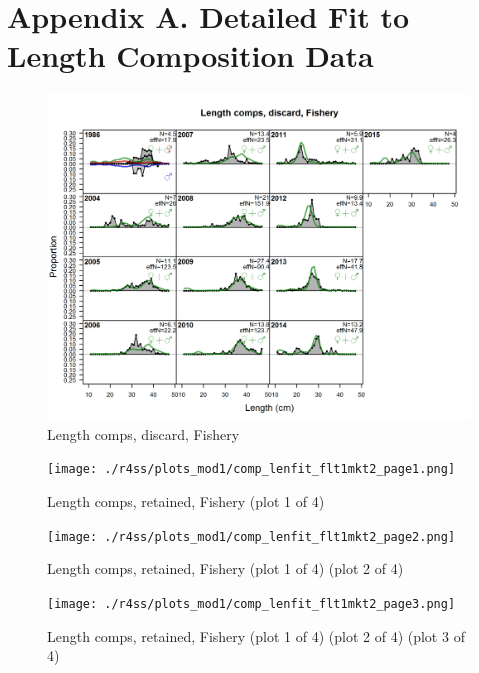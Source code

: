 \documentclass[12pt,]{article}
\begin{document}
\FloatBarrier

\newpage

\FloatBarrier
\newpage

\section{Appendix A. Detailed Fit to Length Composition
Data}\label{appendix-a.-detailed-fit-to-length-composition-data}

\begin{figure}
\centering
\includegraphics{./r4ss/plots_mod1/comp_lenfit_flt1mkt1.png}
\caption{Length comps, discard, Fishery \label{fig:length_fits}}
\end{figure}

\begin{figure}
\centering
\texttt{[image: ./r4ss/plots\_mod1/comp\_lenfit\_flt1mkt2\_page1.png]}
\caption{Length comps, retained, Fishery (plot 1 of 4)
\label{fig:length_fits}}
\end{figure}

\begin{figure}
\centering
\texttt{[image: ./r4ss/plots\_mod1/comp\_lenfit\_flt1mkt2\_page2.png]}
\caption{Length comps, retained, Fishery (plot 1 of 4) (plot 2 of 4)
\label{fig:length_fits}}
\end{figure}

\begin{figure}
\centering
\texttt{[image: ./r4ss/plots\_mod1/comp\_lenfit\_flt1mkt2\_page3.png]}
\caption{Length comps, retained, Fishery (plot 1 of 4) (plot 2 of 4)
(plot 3 of 4) \label{fig:length_fits}}
\end{figure}
\end{document}
